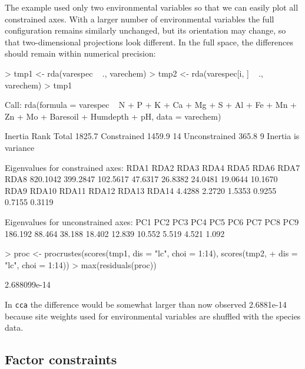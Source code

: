 \documentclass[a4paper,10pt]{amsart}
\begin{document}
The example used only two environmental variables so that we can
easily plot all constrained axes.  With a larger number of
environmental variables the full configuration remains similarly
unchanged, but its orientation may change, so that two-dimensional
projections look different.  In the full space, the differences should
remain within numerical precision:
\begin{Schunk}
\begin{Sinput}
> tmp1 <- rda(varespec ~ ., varechem)
> tmp2 <- rda(varespec[i, ] ~ ., varechem)
> tmp1
\end{Sinput}
\begin{Soutput}
Call: rda(formula = varespec ~ N + P + K + Ca + Mg + S + Al + Fe + Mn +
Zn + Mo + Baresoil + Humdepth + pH, data = varechem)

              Inertia Rank
Total          1825.7     
Constrained    1459.9   14
Unconstrained   365.8    9
Inertia is variance 

Eigenvalues for constrained axes:
    RDA1     RDA2     RDA3     RDA4     RDA5     RDA6     RDA7     RDA8 
820.1042 399.2847 102.5617  47.6317  26.8382  24.0481  19.0644  10.1670 
    RDA9    RDA10    RDA11    RDA12    RDA13    RDA14 
  4.4288   2.2720   1.5353   0.9255   0.7155   0.3119 

Eigenvalues for unconstrained axes:
    PC1     PC2     PC3     PC4     PC5     PC6     PC7     PC8     PC9 
186.192  88.464  38.188  18.402  12.839  10.552   5.519   4.521   1.092 
\end{Soutput}
\begin{Sinput}
> proc <- procrustes(scores(tmp1, dis = "lc", choi = 1:14), scores(tmp2, 
+     dis = "lc", choi = 1:14))
> max(residuals(proc))
\end{Sinput}
\begin{Soutput}
[1] 2.688099e-14
\end{Soutput}
\end{Schunk}
In \texttt{cca} the difference would be somewhat larger than now
observed 2.6881e-14 because site
weights used for environmental variables are shuffled with the species
data.

\subsection{Factor constraints}
\end{document}
